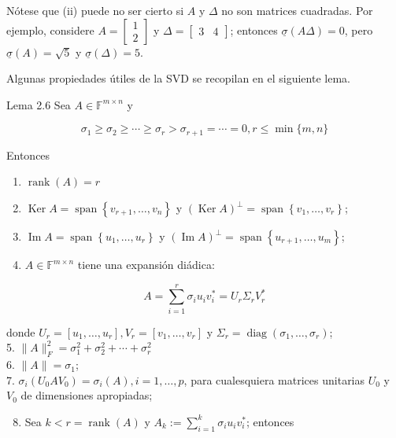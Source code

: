 Nótese que (ii) puede no ser cierto si $A$ y $\Delta$ no son matrices cuadradas. Por ejemplo, considere $A=\left[\begin{array}{l}1 \\ 2\end{array}\right]$ y $\Delta=\left[\begin{array}{ll}3 & 4\end{array}\right]$; entonces $\underline{\sigma}(A \Delta)=0$, pero $\underline{\sigma}(A)=\sqrt{5}$ y $\underline{\sigma}(\Delta)=5$.

Algunas propiedades útiles de la SVD se recopilan en el siguiente lema.

Lema 2.6 Sea $A \in \mathbb{F}^{m \times n}$ y

$$
\sigma_{1} \geq \sigma_{2} \geq \cdots \geq \sigma_{r}>\sigma_{r+1}=\cdots=0, r \leq \min \{m, n\}
$$

Entonces

\begin{enumerate}
  \item $\operatorname{rank}(A)=r$
  \item $\operatorname{Ker} A=\operatorname{span}\left\{v_{r+1}, \ldots, v_{n}\right\}$ y $(\operatorname{Ker} A)^{\perp}=\operatorname{span}\left\{v_{1}, \ldots, v_{r}\right\}$;
  \item $\operatorname{Im} A=\operatorname{span}\left\{u_{1}, \ldots, u_{r}\right\}$ y $(\operatorname{Im} A)^{\perp}=\operatorname{span}\left\{u_{r+1}, \ldots, u_{m}\right\}$;
  \item $A \in \mathbb{F}^{m \times n}$ tiene una expansión diádica:
\end{enumerate}

$$
A=\sum_{i=1}^{r} \sigma_{i} u_{i} v_{i}^{*}=U_{r} \Sigma_{r} V_{r}^{*}
$$

donde $U_{r}=\left[u_{1}, \ldots, u_{r}\right], V_{r}=\left[v_{1}, \ldots, v_{r}\right]$ y $\Sigma_{r}=\operatorname{diag}\left(\sigma_{1}, \ldots, \sigma_{r}\right)$;\\
5. $\|A\|_{F}^{2}=\sigma_{1}^{2}+\sigma_{2}^{2}+\cdots+\sigma_{r}^{2}$\\
6. $\|A\|=\sigma_{1}$;\\
7. $\sigma_{i}\left(U_{0} A V_{0}\right)=\sigma_{i}(A), i=1, \ldots, p$, para cualesquiera matrices unitarias $U_{0}$ y $V_{0}$ de dimensiones apropiadas;

\begin{enumerate}
  \setcounter{enumi}{7}
  \item Sea $k<r=\operatorname{rank}(A)$ y $A_{k}:=\sum_{i=1}^{k} \sigma_{i} u_{i} v_{i}^{*}$; entonces
\end{enumerate}

